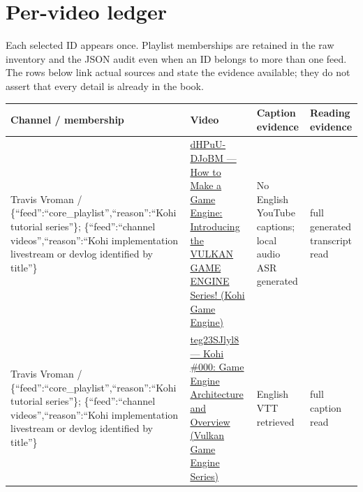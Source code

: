 \section{Per-video ledger}\label{appendix-877738f6f4d2-per-video-ledger}

Each selected ID appears once. Playlist memberships are retained in the raw inventory and the JSON audit even when an ID belongs to more than one feed. The rows below link actual sources and state the evidence available; they do not assert that every detail is already in the book.

{\def\LTcaptype{none} %
\begin{longtable}[]{@{}
  >{\raggedright\arraybackslash}p{}
  >{\raggedright\arraybackslash}p{}
  >{\raggedright\arraybackslash}p{}
  >{\raggedright\arraybackslash}p{}@{}}
\toprule\noalign{}
\begin{minipage}[b]{\linewidth}\raggedright
Channel / membership
\end{minipage} & \begin{minipage}[b]{\linewidth}\raggedright
Video
\end{minipage} & \begin{minipage}[b]{\linewidth}\raggedright
Caption evidence
\end{minipage} & \begin{minipage}[b]{\linewidth}\raggedright
Reading evidence
\end{minipage} \\
\midrule\noalign{}
\endhead
\bottomrule\noalign{}
\endlastfoot
Travis Vroman / \{``feed'':``core\_playlist'',``reason'':``Kohi tutorial series''\}; \{``feed'':``channel videos'',``reason'':``Kohi implementation livestream or devlog identified by title''\} & \href{https://www.youtube.com/watch?v=dHPuU-DJoBM}{dHPuU-DJoBM --- How to Make a Game Engine: Introducing the VULKAN GAME ENGINE Series! (Kohi Game Engine)} & No English YouTube captions; local audio ASR generated & full generated transcript read \\
Travis Vroman / \{``feed'':``core\_playlist'',``reason'':``Kohi tutorial series''\}; \{``feed'':``channel videos'',``reason'':``Kohi implementation livestream or devlog identified by title''\} & \href{https://www.youtube.com/watch?v=teg23SJlyl8}{teg23SJlyl8 --- Kohi \#000: Game Engine Architecture and Overview (Vulkan Game Engine Series)} & English VTT retrieved & full caption read \\

\end{longtable}}
